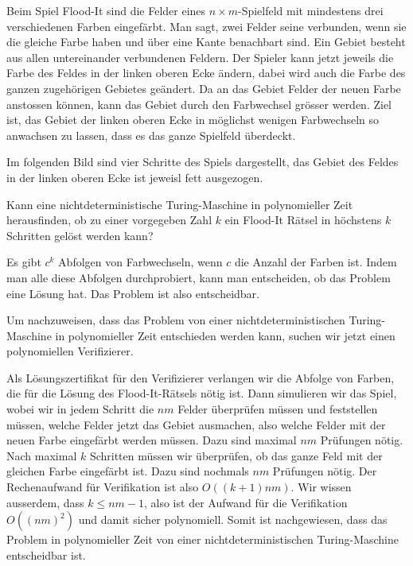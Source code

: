 Beim Spiel Flood-It sind die Felder eines $n\times m$-Spielfeld mit 
mindestens drei verschiedenen Farben eingefärbt.
Man sagt, zwei Felder seine verbunden, wenn sie die gleiche Farbe
haben und über eine Kante benachbart sind.
Ein Gebiet besteht aus allen untereinander verbundenen Feldern.
Der Spieler kann jetzt jeweils die Farbe des Feldes in der linken
oberen Ecke ändern, dabei wird auch die Farbe des ganzen zugehörigen
Gebietes geändert.
Da an das Gebiet Felder der neuen Farbe anstossen können, kann das
Gebiet durch den Farbwechsel grösser werden.
Ziel ist, das Gebiet der linken oberen Ecke in möglichst wenigen
Farbwechseln so anwachsen zu lassen, dass es das ganze Spielfeld überdeckt.

Im folgenden Bild sind vier Schritte des Spiels dargestellt, das Gebiet
des Feldes in der linken oberen Ecke ist jeweisl fett ausgezogen.
\begin{center}
\end{center}
Kann eine nichtdeterministische Turing-Maschine in polynomieller Zeit 
herausfinden, ob zu einer vorgegeben Zahl $k$ ein Flood-It
Rätsel in höchstens $k$ Schritten gelöst werden kann?

\begin{loesung}
Es gibt $c^k$ Abfolgen von Farbwechseln, wenn $c$ die Anzahl der Farben ist.
Indem man alle diese Abfolgen durchprobiert, kann man entscheiden, ob
das Problem eine Lösung hat.
Das Problem ist also entscheidbar.

Um nachzuweisen, dass das Problem von einer nichtdeterministischen
Turing-Maschine in polynomieller Zeit entschieden werden kann,
suchen wir jetzt einen polynomiellen Verifizierer.

Als Lösungszertifikat für den Verifizierer verlangen wir die Abfolge
von Farben, die für die Lösung des Flood-It-Rätsels nötig ist.
Dann simulieren wir das Spiel, wobei wir in jedem Schritt
die $nm$ Felder überprüfen müssen und feststellen müssen, welche
Felder jetzt das Gebiet ausmachen, also welche Felder mit der neuen
Farbe eingefärbt werden müssen.
Dazu sind maximal $nm$ Prüfungen nötig.
Nach maximal $k$ Schritten müssen wir überprüfen, ob das ganze Feld
mit der gleichen Farbe eingefärbt ist.
Dazu sind nochmals $nm$ Prüfungen nötig.
Der Rechenaufwand für Verifikation ist also $O((k+1)nm)$.
Wir wissen ausserdem, dass $k\le nm-1$, also ist der Aufwand für die
Verifikation $O((nm)^2)$ und damit sicher polynomiell.
Somit ist nachgewiesen, dass das Problem in polynomieller Zeit von
einer nichtdeterministischen Turing-Maschine entscheidbar ist.
\end{loesung}

